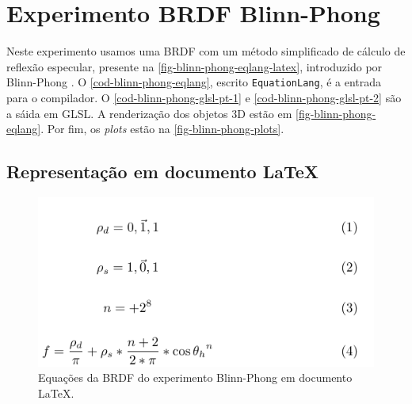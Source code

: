 \section{Experimento BRDF Blinn-Phong}

Neste experimento usamos uma BRDF com um método simplificado de cálculo de reflexão especular, presente na \autoref{fig-blinn-phong-eqlang-latex}, introduzido por Blinn-Phong \cite{blinn1977models}. O \autoref{cod-blinn-phong-eqlang}, escrito \texttt{EquationLang}, é a entrada para o compilador. O \autoref{cod-blinn-phong-glsl-pt-1} e \autoref{cod-blinn-phong-glsl-pt-2} são a sáida em GLSL. A renderização dos objetos 3D estão em \autoref{fig-blinn-phong-eqlang}. Por fim, os \textit{plots} estão na \autoref{fig-blinn-phong-plots}.

\subsection{Representação em documento \LaTeX{}}
\begin{figure}[H]
    \caption{\label{fig-blinn-phong-eqlang-latex} 
    \small Equações da BRDF do experimento Blinn-Phong em documento \LaTeX{}.}
    \begin{center}
        \includegraphics[scale=0.92]{./Imagens/brdfs/blinn-phong.pdf}
    \end{center}
\end{figure}


